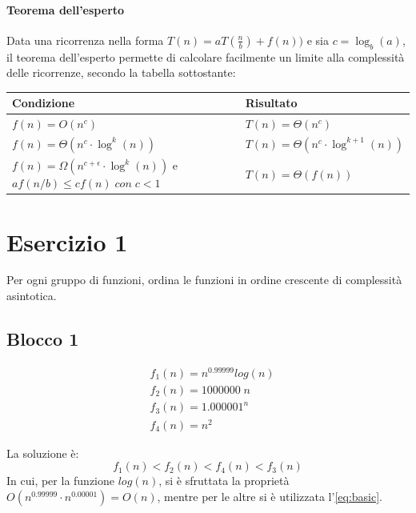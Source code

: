 \documentclass{article}
\begin{document}
\paragraph{Teorema dell'esperto}
Data una ricorrenza nella forma $T(n) = aT\left(\frac{n}{b}\right) + f(n))$ e sia $c = \log_b(a)$, il teorema dell'esperto permette di calcolare facilmente un limite alla complessità delle ricorrenze, secondo la tabella sottostante:

\begin{center}
    \begin{tabular}{ | C{5.0cm} | C{5.0cm} |}
        \hline
        Condizione &  Risultato \\ [2ex] 
        \hline\hline
        $f(n) = O(n^c)$ & $T(n) = \Theta(n^c)$ \\  [2ex]
        \hline
        $f(n) = \Theta(n^c\cdot\log^k(n))$ & $T(n) = \Theta(n^c\cdot\log^{k+1}(n))$ \\ [2ex]
        \hline
        $f(n) = \Omega(n^{c+\epsilon}\cdot\log^k(n))$ e $a f(n/b)\leq cf(n)\; con\; c<1$ & $T(n) = \Theta(f(n))$ \\ [2ex]
        \hline
    \end{tabular}
\end{center}
\newpage
\section{Esercizio 1}

Per ogni gruppo di funzioni, ordina le funzioni in ordine crescente di complessità asintotica.

\subsection{Blocco 1}

\begin{equation*}
    \begin{split}
        & f_1(n) = n^{0.99999} log(n) \\
        & f_2(n) = 1000000\; n \\
        & f_3(n) = 1.000001^n\\
        & f_4(n) = n^2
    \end{split}
\end{equation*}

La soluzione è:
\begin{equation*}
    f_1(n) < f_2(n) < f_4(n) < f_3(n) 
\end{equation*}
In cui, per la funzione $log(n)$, si è sfruttata la proprietà $O(n^{0.99999}\cdot n^{0.00001}) = O(n)$, mentre per le altre si è utilizzata l'\cref{eq:basic}.
\end{document}
